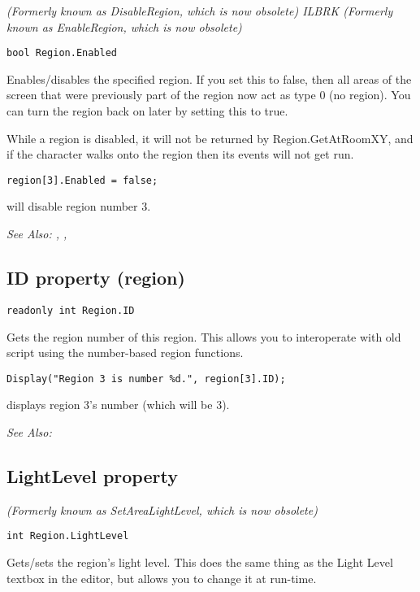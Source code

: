 \it{(Formerly known as DisableRegion, which is now obsolete)} ILBRK
\it{(Formerly known as EnableRegion, which is now obsolete)}

\begin{verbatim}
bool Region.Enabled
\end{verbatim}
Enables/disables the specified region. If you set this to false, then all areas of the screen
that were previously part of the region now act as type 0 (no region). You can turn the region
back on later by setting this to true.

While a region is disabled, it will not be returned by Region.GetAtRoomXY, and if
the character walks onto the region then its events will not get run.

\begin{verbatim}
region[3].Enabled = false;
\end{verbatim}
will disable region number 3.

\it{See Also:} ,
,


\subsection{ID property (region)}\label{Region.ID}%

\begin{verbatim}
readonly int Region.ID
\end{verbatim}
Gets the region number of this region. This allows you to interoperate with old
script using the number-based region functions.

\begin{verbatim}
Display("Region 3 is number %d.", region[3].ID);
\end{verbatim}
displays region 3's number (which will be 3).

\it{See Also:} 


\subsection{LightLevel property}\label{Region.LightLevel}%

\it{(Formerly known as SetAreaLightLevel, which is now obsolete)}

\begin{verbatim}
int Region.LightLevel
\end{verbatim}
Gets/sets the region's light level. This does the same thing as the Light Level
textbox in the editor, but allows you to change it at run-time.

